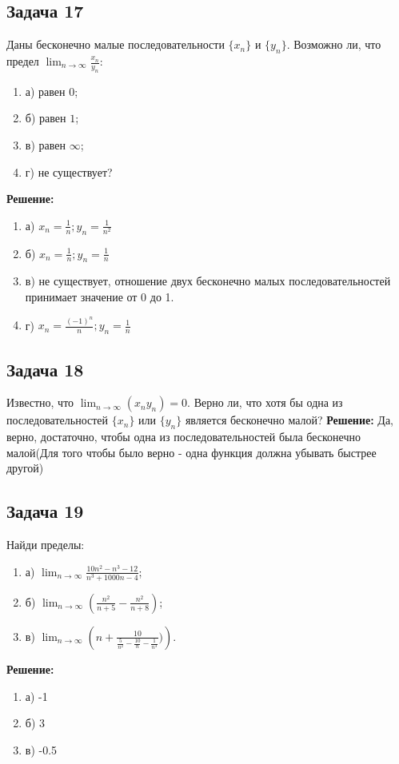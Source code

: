 \documentclass[a4paper,12pt]{article}
\begin{document}
\subsection{Задача 17}
Даны бесконечно малые последовательности $\{x_n\}$ и $\{y_n\}$. Возможно ли, что предел $\lim_{n \to \infty} \frac{x_n}{y_n}$:
\begin{enumerate}
    \item а) равен $0$;
    \item б) равен $1$;
    \item в) равен $\infty$;
    \item г) не существует?
\end{enumerate}
\textbf{Решение: }
\begin{enumerate}
    \item а) $x_n = \frac{1}{n}; y_n = \frac{1}{n^2}$
    \item б) $x_n = \frac{1}{n}; y_n = \frac{1}{n}$
    \item в) не существует, отношение двух бесконечно малых последовательностей принимает значение от 0 до 1.
    \item г) $x_n = \frac{(-1)^n}{n}; y_n = \frac{1}{n}$
\end{enumerate}

\subsection{Задача 18}
Известно, что $\lim_{n \to \infty} (x_n y_n) = 0$. Верно ли, что хотя бы одна из последовательностей $\{x_n\}$ или $\{y_n\}$ является бесконечно малой?
\textbf{Решение: }
Да, верно, достаточно, чтобы одна из последовательностей была бесконечно малой(Для того чтобы было верно - одна функция должна убывать быстрее другой)

\subsection{Задача 19}
Найди пределы:
\begin{enumerate}
    \item а) $\lim_{n \to \infty} \frac{10n^2 - n^3 - 12}{n^3 + 1000n - 4}$;
    \item б) $\lim_{n \to \infty} \left(\frac{n^2}{n+5} - \frac{n^2}{n+8}\right)$;
    \item в) $\lim_{n \to \infty} \left( n + \frac{10}{\frac{5}{n^2}-\frac{10}{n}-\frac{1}{n^3}})\right)$.
\end{enumerate}
\textbf{Решение: }
\begin{enumerate}
    \item а) -1
    \item б) 3
    \item в) -0.5
\end{enumerate}
\end{document}
